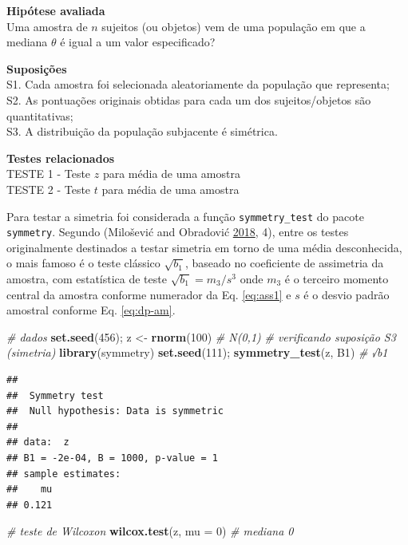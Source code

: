 \documentclass[
]{book}
\newenvironment{Shaded}{\begin{snugshade}}{\end{snugshade}}
\newcommand{\CommentTok}[1]{\textcolor[rgb]{0.56,0.35,0.01}{\textit{#1}}}
\newcommand{\DataTypeTok}[1]{\textcolor[rgb]{0.13,0.29,0.53}{#1}}
\newcommand{\DecValTok}[1]{\textcolor[rgb]{0.00,0.00,0.81}{#1}}
\newcommand{\KeywordTok}[1]{\textcolor[rgb]{0.13,0.29,0.53}{\textbf{#1}}}
\newcommand{\NormalTok}[1]{#1}
\newcommand{\StringTok}[1]{\textcolor[rgb]{0.31,0.60,0.02}{#1}}
\theoremstyle{definition}
\theoremstyle{definition}
\theoremstyle{definition}
\theoremstyle{remark}
\begin{document}
\textbf{Hipótese avaliada}\\
Uma amostra de \(n\) sujeitos (ou objetos) vem de uma população em que a mediana \(\theta\) é igual a um valor especificado?

\textbf{Suposições}\\
S1. Cada amostra foi selecionada aleatoriamente da população que representa;\\
S2. As pontuações originais obtidas para cada um dos sujeitos/objetos são quantitativas;\\
S3. A distribuição da população subjacente é simétrica.

\textbf{Testes relacionados}\\
TESTE 1 - Teste \(z\) para média de uma amostra\\
TESTE 2 - Teste \(t\) para média de uma amostra

Para testar a simetria foi considerada a função \texttt{symmetry\_test} do pacote \texttt{symmetry}. Segundo (Milošević and Obradović \protect\hyperlink{ref-milosevic2018comparison}{2018}, 4), entre os testes originalmente destinados a testar simetria em torno de uma média desconhecida, o mais famoso é o teste clássico \(\sqrt{b_1}\), baseado no coeficiente de assimetria da amostra, com estatística de teste \(\sqrt{b_1} = m_3/s^3\) onde \(m_3\) é o terceiro momento central da amostra conforme numerador da Eq. \eqref{eq:ass1} e \(s\) é o desvio padrão amostral conforme Eq. \eqref{eq:dp-am}.

\begin{Shaded}
\begin{Highlighting}[]
\CommentTok{\# dados}
\KeywordTok{set.seed}\NormalTok{(}\DecValTok{456}\NormalTok{); z \textless{}{-}}\StringTok{ }\KeywordTok{rnorm}\NormalTok{(}\DecValTok{100}\NormalTok{) }\CommentTok{\# N(0,1)}
\CommentTok{\# verificando suposição S3 (simetria)}
\KeywordTok{library}\NormalTok{(symmetry)}
\KeywordTok{set.seed}\NormalTok{(}\DecValTok{111}\NormalTok{); }\KeywordTok{symmetry\_test}\NormalTok{(z, }\StringTok{\textquotesingle{}B1\textquotesingle{}}\NormalTok{)  }\CommentTok{\# √b1}
\end{Highlighting}
\end{Shaded}

\begin{verbatim}
## 
##  Symmetry test
##  Null hypothesis: Data is symmetric
## 
## data:  z
## B1 = -2e-04, B = 1000, p-value = 1
## sample estimates:
##    mu 
## 0.121
\end{verbatim}

\begin{Shaded}
\begin{Highlighting}[]
\CommentTok{\# teste de Wilcoxon}
\KeywordTok{wilcox.test}\NormalTok{(z, }\DataTypeTok{mu =} \DecValTok{0}\NormalTok{) }\CommentTok{\# mediana 0}
\end{Highlighting}
\end{Shaded}
\end{document}
